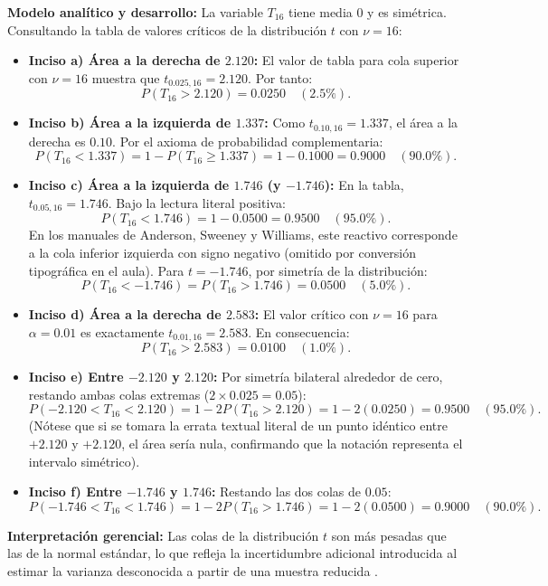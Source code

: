 {\textbf{Modelo analítico y desarrollo:}
La variable $T_{16}$ tiene media 0 y es simétrica. Consultando la tabla de valores críticos de la distribución $t$ con $\nu = 16$:
\begin{itemize}
  \item \textbf{Inciso a) Área a la derecha de $2.120$:} El valor de tabla para cola superior con $\nu = 16$ muestra que $t_{0.025, 16} = 2.120$. Por tanto:
  \[
    P(T_{16} > 2.120) = 0.0250 \quad (2.5\%).
  \]
  \item \textbf{Inciso b) Área a la izquierda de $1.337$:} Como $t_{0.10, 16} = 1.337$, el área a la derecha es $0.10$. Por el axioma de probabilidad complementaria:
  \[
    P(T_{16} < 1.337) = 1 - P(T_{16} \ge 1.337) = 1 - 0.1000 = 0.9000 \quad (90.0\%).
  \]
  \item \textbf{Inciso c) Área a la izquierda de $1.746$ (y $-1.746$):} En la tabla, $t_{0.05, 16} = 1.746$. 
  Bajo la lectura literal positiva:
  \[
    P(T_{16} < 1.746) = 1 - 0.0500 = 0.9500 \quad (95.0\%).
  \]
  En los manuales de Anderson, Sweeney y Williams, este reactivo corresponde a la cola inferior izquierda con signo negativo (omitido por conversión tipográfica en el aula). Para $t = -1.746$, por simetría de la distribución:
  \[
    P(T_{16} < -1.746) = P(T_{16} > 1.746) = 0.0500 \quad (5.0\%).
  \]
  \item \textbf{Inciso d) Área a la derecha de $2.583$:} El valor crítico con $\nu = 16$ para $\alpha = 0.01$ es exactamente $t_{0.01, 16} = 2.583$. En consecuencia:
  \[
    P(T_{16} > 2.583) = 0.0100 \quad (1.0\%).
  \]
  \item \textbf{Inciso e) Entre $-2.120$ y $2.120$:} Por simetría bilateral alrededor de cero, restando ambas colas extremas ($2 \times 0.025 = 0.05$):
  \[
    P(-2.120 < T_{16} < 2.120) = 1 - 2 P(T_{16} > 2.120) = 1 - 2(0.0250) = 0.9500 \quad (95.0\%).
  \]
  (Nótese que si se tomara la errata textual literal de un punto idéntico entre $+2.120$ y $+2.120$, el área sería nula, confirmando que la notación representa el intervalo simétrico).
  \item \textbf{Inciso f) Entre $-1.746$ y $1.746$:} Restando las dos colas de $0.05$:
  \[
    P(-1.746 < T_{16} < 1.746) = 1 - 2 P(T_{16} > 1.746) = 1 - 2(0.0500) = 0.9000 \quad (90.0\%).
  \]
\end{itemize}
\textbf{Interpretación gerencial:} Las colas de la distribución $t$ son más pesadas que las de la normal estándar, lo que refleja la incertidumbre adicional introducida al estimar la varianza desconocida a partir de una muestra reducida \citep{wackerly2010}.

}

